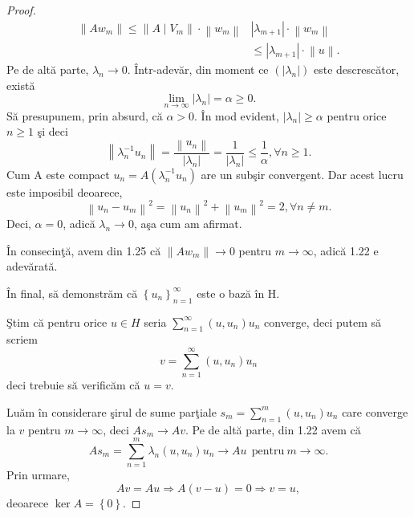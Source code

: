 \documentclass[a4paper,12pt,oneside]{report}
\begin{document}
\begin{proof}
\begin{equation}
\begin{split}
        \left \| Aw_{m} \right \| \leq \left \| A\mid V_{m} \right \| \cdot \left \| w_{m} \right \| & \left | \lambda _{m+1} \right | \cdot \left \| w_{m} \right \| \\ & \leq \left | \lambda _{m+1} \right | \cdot \left \| u\right \| .
    \end{split}
\end{equation}
Pe de alt\u{a} parte, \(\lambda _{n} \rightarrow 0\). \^{I}ntr-adev\u{a}r, din moment ce \(\left ( \left | \lambda _{n} \right | \right )\) este descresc\u{a}tor,  exist\u{a}
\begin{displaymath}
  \lim_{n\rightarrow \infty }\left | \lambda _{n} \right | = \alpha \geq  0.
\end{displaymath}
S\u{a} presupunem, prin absurd, c\u{a} \(\alpha > 0\). \^{I}n mod evident, \(\left | \lambda _{n} \right |\geq \alpha \) pentru orice \(n\geq 1\) \c{s}i deci
\begin{displaymath}
  \left \| \lambda_{n}^{-1} u_{n}\right \| = \frac{\left \| u_{n} \right \|}{\left | \lambda _{n} \right |} = \frac{1}{\left | \lambda _{n} \right |} \leq \frac{1}{\alpha }, \forall n\geq 1.
\end{displaymath}
Cum A este compact \(u_{n} = A\left ( \lambda _{n}^{-1}u_{n} \right )\) are un sub\c{s}ir convergent. Dar acest lucru este imposibil deoarece,
\begin{displaymath}
  \left \| u_{n}-u_{m} \right \|^{2} = \left \| u_{n} \right \|^{2} + \left \| u_{m} \right \|^{2} = 2, \forall n\neq m.
\end{displaymath}
Deci, \(\alpha  = 0\), adic\u{a} \(\lambda _{n} \rightarrow 0\), a\c{s}a cum am afirmat.

\noindent \^{I}n consecin\c{t}\u{a}, avem din 1.25 c\u{a} \(\left \| Aw_{m} \right \| \rightarrow 0\) pentru \(m\rightarrow \infty \), adic\u{a} 1.22 e adev\u{a}rat\u{a}.

\^{I}n final, s\u{a} demonstr\u{a}m c\u{a} \(\left \{ u_{n} \right \}_{n=1}^{\infty }\) este o baz\u{a} \^{i}n H.

\noindent \c{S}tim c\u{a} pentru orice \( u \in H\) seria \(\sum_{n=1}^{\infty }\left ( u,u_{n} \right )u_{n}\) converge, deci putem s\u{a} scriem
\begin{displaymath}
  v = \sum_{n=1}^{\infty }\left ( u,u_{n} \right )u_{n}
\end{displaymath}
deci  trebuie s\u{a} verific\u{a}m c\u{a} \(u = v\).

Lu\u{a}m \^{i}n considerare \c{s}irul de sume par\c{t}iale \(s_{m} = \sum_{n=1}^{m}\left ( u,u_{n} \right )u_{n}\) care converge la \(v\) pentru \(m\rightarrow \infty \), deci \(As_{m} \rightarrow Av\). Pe de alt\u{a} parte, din 1.22 avem c\u{a}
\begin{displaymath}
  As_{m} = \sum_{n=1}^{m}\lambda _{n}\left ( u,u_{n} \right )u_{n} \rightarrow Au~~ \text{pentru}~ m\rightarrow \infty.
\end{displaymath}
Prin urmare,
\begin{displaymath}
  Av = Au \Rightarrow A\left ( v-u \right ) = 0\Rightarrow v = u,
\end{displaymath}
deoarece \(\ker A = \left \{ 0 \right \}\).


\end{proof}
\end{document}
